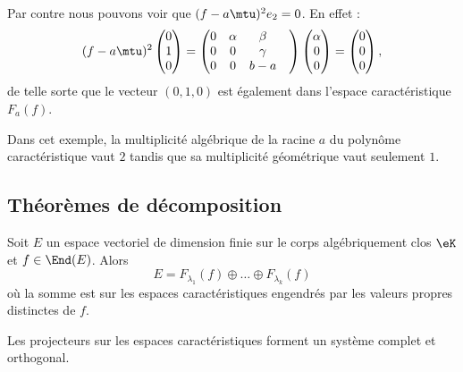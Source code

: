 \begin{remark}
	Par contre nous pouvons voir que \( (f-a\mtu)^2e_2=0\). En effet :
	\begin{equation}
		(f-a\mtu)^2\begin{pmatrix}
			0 \\
			1 \\
			0
		\end{pmatrix}=\begin{pmatrix}
			0 & \alpha & \beta    \\
			0 & 0      & \gamma   \\
			0 & 0      & b-a     &
		\end{pmatrix}\begin{pmatrix}
			\alpha \\
			0      \\
			0
		\end{pmatrix}=\begin{pmatrix}
			0 \\
			0 \\
			0
		\end{pmatrix},
	\end{equation}
	de telle sorte que le vecteur \( (0,1,0)\) est également dans l'espace caractéristique \( F_a(f)\).

	Dans cet exemple, la multiplicité algébrique de la racine \( a\) du polynôme caractéristique vaut \( 2\) tandis que sa multiplicité géométrique vaut seulement \( 1\).
\end{remark}

\subsection{Théorèmes de décomposition}

\begin{theorem}     \label{ThoSpectraluRMLok}
	Soit \( E\) un espace vectoriel de dimension finie sur le corps algébriquement clos \( \eK\) et \( f\in\End(E)\). Alors
	\begin{equation}    \label{EqCTFHooBSGhYK}
		E=F_{\lambda_1}(f)\oplus\ldots\oplus F_{\lambda_k}(f)
	\end{equation}
	où la somme est sur les espaces caractéristiques engendrés par les valeurs propres distinctes de \( f\).

	Les projecteurs sur les espaces caractéristiques forment un système complet et orthogonal.
\end{theorem}

